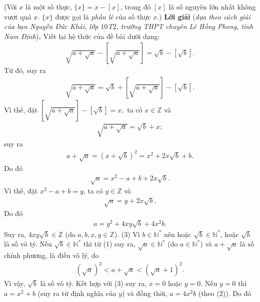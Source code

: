 \begin{multicols}{2}
	\vskip 0.05cm
	(Với $x$ là một số thực, $\{x\}=x-[x]$, trong đó $[x]$ là số nguyên lớn nhất không vượt quá $x$. $\{x\}$ được gọi là {\it phần lẻ} của số thực $x$.)
	\vskip 0.05cm
	\textbf{\color{thachthuctoanhoc}Lời giải} (\textit{dựa theo cách giải của bạn Nguyễn Đức Khải, lớp $10$T$2$, trường THPT chuyên Lê Hồng Phong, tỉnh Nam Định})\textbf{\color{thachthuctoanhoc}.}
	\vskip 0.05cm
	Viết lại hệ thức của đề bài dưới dạng:
	\begin{align*}
		\sqrt {a + \sqrt a }  - \left[ {\sqrt {a + \sqrt a } } \right] = \sqrt b  - \left[ {\sqrt b } \right].
	\end{align*}
	Từ đó, suy ra
	\begin{align*}
		\sqrt {a + \sqrt a }  = \sqrt b  + \left[ {\sqrt {a + \sqrt a } } \right] - \left[ {\sqrt b } \right].
	\end{align*}
	Vì thế, đặt $\left[ {\sqrt {a + \sqrt a } } \right] - \left[ {\sqrt b } \right] = x,$  ta có $x \in \mathbb{Z}$ và
	\begin{align*}
		\sqrt {a + \sqrt a }  = \sqrt b  + x;
	\end{align*}
	suy ra
	\begin{align*}
		a \!+\! \sqrt a  \!=\! {\left( {x \!+\! \sqrt b } \right)^2} \!=\! {x^2} \!+\! 2x\sqrt b  \!+\! b. \tag{$1$}
	\end{align*}
	Do đó
	\begin{align*}
		\sqrt a  = {x^2} - a + b + 2x\sqrt b .
	\end{align*}
	Vì thế, đặt ${x^2} - a + b = y$,  ta có  $y \in \mathbb{Z}$ và
	\begin{align*}
		\sqrt a  = y + 2x\sqrt b .
	\end{align*}
	Do đó
	\begin{align*}
		a = {y^2} + 4xy\sqrt b  + 4{x^2}b. \tag{$2$}
	\end{align*}
	Suy ra, $4xy\sqrt{b} \in \mathbb{Z}$ (do $a, b, x, y \in \mathbb{Z}$). \hfill ($3$)
	\vskip 0.05cm
	Vì $b \in \mathbb{N^*}$  nên hoặc $\sqrt{b} \in \mathbb{N^*}$,  hoặc $\sqrt{b}$  là số vô tỷ.
	\vskip 0.05cm
	Nếu $\sqrt{b} \in \mathbb{N^*}$ thì từ ($1$) suy ra, $\sqrt{a} \in \mathbb{N^*}$  (do  $a \in \mathbb{N^*}$) và $a + \sqrt{a}$  là số chính phương, là điều vô lý, do
	\begin{align*}
		{\left( {\sqrt a } \right)^2} < a + \sqrt a  < {\left( {\sqrt a  + 1} \right)^2}.
	\end{align*}
	Vì vậy, $\sqrt{b}$  là số vô tỷ. Kết hợp với ($3$) suy ra, $x = 0$ hoặc $y = 0$.
	\vskip 0.05cm
	Nếu $y = 0$ thì $a = x^2 + b$  (suy ra từ định nghĩa của $y$) và đồng thời, $a = 4x^2b$  (theo ($2$)). Do đó

\end{multicols}
